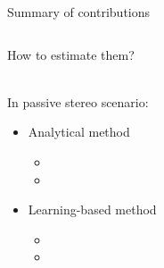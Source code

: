 \begin{frame}[t]{Summary of contributions}

    \begin{columns}[T,onlytextwidth]

        \begin{column}{0.48\textwidth}
            \begin{center}
                \alert{How to estimate them?}
            \end{center}
            \\In passive stereo scenario:
            \begin{itemize}
                \item Analytical method{\footnotesize
                \begin{itemize}
                    \item[\cmark] 
                    \item[\xmark] 
                \end{itemize}}
                \item Learning-based method{\footnotesize
                \begin{itemize}
                    \item[\cmark] 
                    \item[\xmark] 
                \end{itemize}}
            \end{itemize}
        \end{column}


\end{columns}
\end{frame}
